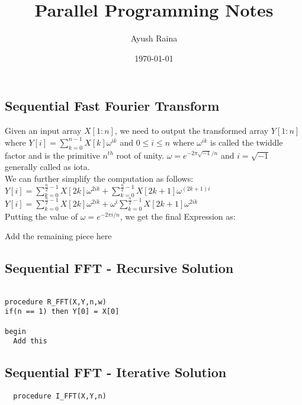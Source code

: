 \documentclass{article}
\title{Parallel Programming Notes}
\author{Ayush Raina}
\date{\today}
\begin{document}
 

\maketitle

\subsection*{Sequential Fast Fourier Transform}
Given an input array $X[1:n]$, we need to output the transformed array $Y[1:n]$ where $Y[i] = \sum_{k=0}^{n-1} X[k] \omega^{ik}$ and $0 \leq i \leq n$ where $\omega^{ik}$ is called the twiddle factor and is the primitive $n^{th}$ root of unity. $\omega = e^{-2\pi \sqrt{-1}/n}$ and $i = \sqrt{-1}$ generally called as iota. \\

We can further simplify the computation as follows:
$Y[i] = \sum_{k=0}^{\frac{n}{2}-1} X[2k] \omega^{2ik} + \sum_{k=0}^{\frac{n}{2}-1} X[2k+1] \omega^{(2k+1)i}$ \\
$Y[i] = \sum_{k=0}^{\frac{n}{2}-1} X[2k] \omega^{2ik} + \omega^i \sum_{k=0}^{\frac{n}{2}-1} X[2k+1] \omega^{2ik}$ \\

Putting the value of $\omega = e^{-2\pi i/n}$, we get the final Expression as:

Add the remaining piece here

\newpage

\subsection*{Sequential FFT - Recursive Solution}
\begin{lstlisting}

procedure R_FFT(X,Y,n,w)
if(n == 1) then Y[0] = X[0]

begin
  Add this

\end{lstlisting}

\subsection*{Sequential FFT - Iterative Solution}
\begin{lstlisting}
  procedure I_FFT(X,Y,n)
  
\end{lstlisting}
\end{document}
